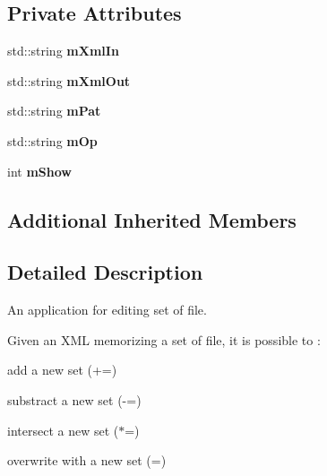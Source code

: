 \subsection*{Private Attributes}
\begin{DoxyCompactItemize}
\item 
std\+::string {\bfseries m\+Xml\+In}\hypertarget{classMMVII_1_1cAppli__EditSet_aca6ab5f1087101924c317801b7cfa405}{}\label{classMMVII_1_1cAppli__EditSet_aca6ab5f1087101924c317801b7cfa405}

\item 
std\+::string {\bfseries m\+Xml\+Out}\hypertarget{classMMVII_1_1cAppli__EditSet_a167cae833355b25d082de808f3c1e82a}{}\label{classMMVII_1_1cAppli__EditSet_a167cae833355b25d082de808f3c1e82a}

\item 
std\+::string {\bfseries m\+Pat}\hypertarget{classMMVII_1_1cAppli__EditSet_a2557a5ed8724d22ce3e257c67c4392b9}{}\label{classMMVII_1_1cAppli__EditSet_a2557a5ed8724d22ce3e257c67c4392b9}

\item 
std\+::string {\bfseries m\+Op}\hypertarget{classMMVII_1_1cAppli__EditSet_aec2bd0ee4b6a792d5c38ee2ec7afb0de}{}\label{classMMVII_1_1cAppli__EditSet_aec2bd0ee4b6a792d5c38ee2ec7afb0de}

\item 
int {\bfseries m\+Show}\hypertarget{classMMVII_1_1cAppli__EditSet_aa298745f6a4f8571ca9720f3eeeb6a20}{}\label{classMMVII_1_1cAppli__EditSet_aa298745f6a4f8571ca9720f3eeeb6a20}

\end{DoxyCompactItemize}
\subsection*{Additional Inherited Members}


\subsection{Detailed Description}
An application for editing set of file. 

Given an X\+ML memorizing a set of file, it is possible to \+:


\begin{DoxyItemize}
\item add a new set (+=)
\item substract a new set (-\/=)
\item intersect a new set ($\ast$=)
\item overwrite with a new set (=)
\end{DoxyItemize}

